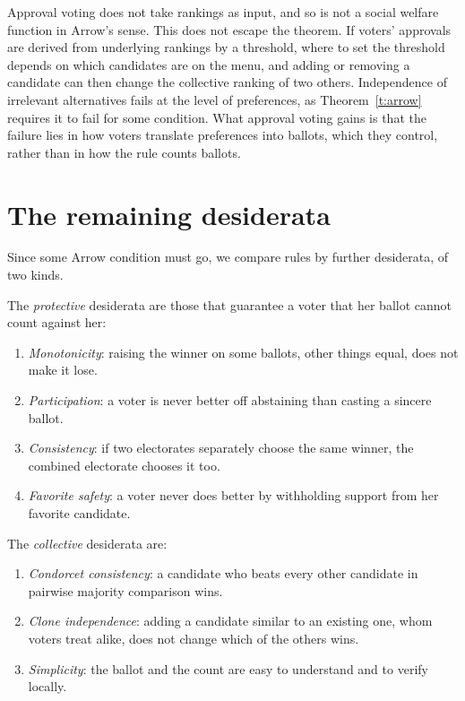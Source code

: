 \documentclass{situationist-preprint}
\begin{document}
Approval voting does not take rankings as input, and so is not a social welfare function in Arrow's sense. This does not escape the theorem. If voters' approvals are derived from underlying rankings by a threshold, where to set the threshold depends on which candidates are on the menu, and adding or removing a candidate can then change the collective ranking of two others. Independence of irrelevant alternatives fails at the level of preferences, as Theorem~\ref{t:arrow} requires it to fail for some condition. What approval voting gains is that the failure lies in how voters translate preferences into ballots, which they control, rather than in how the rule counts ballots.

\section{The remaining desiderata}

Since some Arrow condition must go, we compare rules by further desiderata, of two kinds.

\begin{definition}\label{d:protective}
The \emph{protective} desiderata are those that guarantee a voter that her ballot cannot count against her:
\begin{enumerate}[label=(P\arabic*)]
\item \emph{Monotonicity}: raising the winner on some ballots, other things equal, does not make it lose.
\item \emph{Participation}: a voter is never better off abstaining than casting a sincere ballot.
\item \emph{Consistency}: if two electorates separately choose the same winner, the combined electorate chooses it too.
\item \emph{Favorite safety}: a voter never does better by withholding support from her favorite candidate.
\end{enumerate}
\end{definition}

\begin{definition}\label{d:collective}
The \emph{collective} desiderata are:
\begin{enumerate}[label=(C\arabic*)]
\item \emph{Condorcet consistency}: a candidate who beats every other candidate in pairwise majority comparison wins.
\item \emph{Clone independence}: adding a candidate similar to an existing one, whom voters treat alike, does not change which of the others wins.
\item \emph{Simplicity}: the ballot and the count are easy to understand and to verify locally.
\end{enumerate}
\end{definition}
\end{document}
